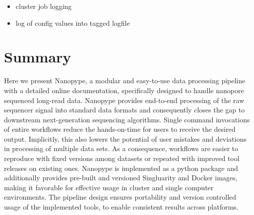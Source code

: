 \begin{itemize}
	\item cluster job logging
	\item log of config values into tagged logfile
\end{itemize}




\section{Summary}
\label{sec:nanopype:summary}
Here we present Nanopype, a modular and easy-to-use data processing pipeline with a detailed online documentation, specifically designed to handle nanopore sequenced long-read data.
Nanopype provides end-to-end processing of the raw sequencer signal into standard data formats and consequently closes the gap to downstream next-generation sequencing algorithms. Single command invocations of entire workflows reduce the hands-on-time for users to receive the desired output. Implicitly, this also lowers the potential of user mistakes and deviations in processing of multiple data sets. As a consequence, workflows are easier to reproduce with fixed versions among datasets or repeated with improved tool releases on existing ones.
Nanopype is implemented as a python package and additionally provides pre-built and versioned Singluarity and Docker images, making it favorable for effective usage in cluster and single computer environments. The pipeline design ensures portability and version controlled usage of the implemented tools, to enable consistent results across platforms.


